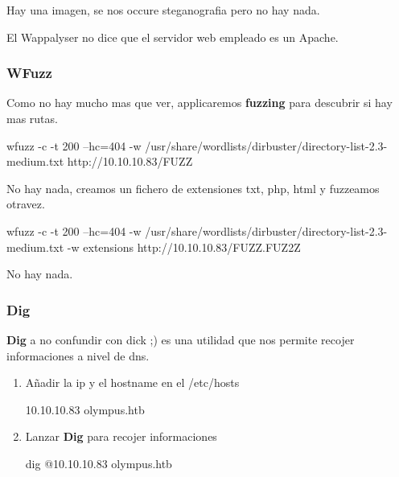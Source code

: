 \documentclass{assets/ipesethesis}
\newenvironment{Shaded}{\begin{snugshade}}{\end{snugshade}}
\newcommand{\ExtensionTok}[1]{#1}
\newcommand{\NormalTok}[1]{#1}
\begin{document}
Hay una imagen, se nos occure steganografia pero no hay nada.

El Wappalyser no dice que el servidor web empleado es un Apache.

\hypertarget{wfuzz}{%
\subsubsection*{WFuzz}\label{wfuzz}}

Como no hay mucho mas que ver, applicaremos \textbf{fuzzing} para descubrir si hay mas rutas.

\begin{Shaded}
\begin{Highlighting}[]
\ExtensionTok{wfuzz}\NormalTok{ -c -t 200 --hc=404 -w /usr/share/wordlists/dirbuster/directory-list-2.3-medium.txt http://10.10.10.83/FUZZ}
\end{Highlighting}
\end{Shaded}

No hay nada, creamos un fichero de extensiones txt, php, html y fuzzeamos otravez.

\begin{Shaded}
\begin{Highlighting}[]
\ExtensionTok{wfuzz}\NormalTok{ -c -t 200 --hc=404 -w /usr/share/wordlists/dirbuster/directory-list-2.3-medium.txt -w extensions http://10.10.10.83/FUZZ.FUZ2Z}
\end{Highlighting}
\end{Shaded}

No hay nada.

\hypertarget{dig}{%
\subsubsection*{Dig}\label{dig}}

\textbf{Dig} a no confundir con dick ;) es una utilidad que nos permite recojer informaciones a nivel de dns.

\begin{enumerate}
\def\labelenumi{\arabic{enumi}.}
\item
  Añadir la ip y el hostname en el /etc/hosts

\begin{Shaded}
\begin{Highlighting}[]
\ExtensionTok{10.10.10.83}\NormalTok{ olympus.htb}
\end{Highlighting}
\end{Shaded}
\item
  Lanzar \textbf{Dig} para recojer informaciones

\begin{Shaded}
\begin{Highlighting}[]
\ExtensionTok{dig}\NormalTok{ @10.10.10.83 olympus.htb}
\end{Highlighting}
\end{Shaded}
\end{enumerate}
\end{document}
